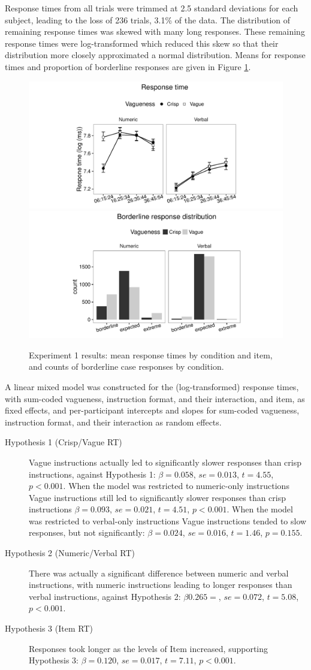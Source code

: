 Response times from all trials were trimmed at 2.5 standard deviations for each subject, leading to the loss of 236 trials, 3.1\% of the data. The distribution of remaining response times was skewed with many long responses. These remaining response times were log-transformed which reduced this skew so that their distribution more closely approximated a normal distribution. Means for response times and proportion of borderline responses are given in Figure \ref{resultsC-exp-1}. 

\begin{figure}[htbp]
\centering
\includegraphics[trim = 20mm 0mm 30mm 0mm, clip, width=.49\textwidth]{figures/Ce1-rtplot-1.pdf}
\includegraphics[trim = 20mm 0mm 25mm 0mm, clip, width=.49\textwidth]{figures/Ce1-blBarChart-1}
\caption{Experiment 1 results: mean response times by condition and item, and counts of borderline case responses by condition.}
\label{resultsC-exp-1}
\end{figure}

A linear mixed model was constructed for the (log-transformed) response times, with sum-coded vagueness, instruction format, and their interaction, and item, as fixed effects, and per-participant intercepts and slopes for sum-coded vagueness, instruction format, and their interaction as random effects. 

\begin{description}
\item [Hypothesis 1 (Crisp/Vague RT)] Vague instructions actually led to significantly slower responses than crisp instructions, against Hypothesis 1: $\beta=0.058$, $se=0.013$, $t=4.55$, $p<0.001$. When the model was restricted to numeric-only instructions Vague instructions still led to significantly slower responses than crisp instructions $\beta=0.093$, $se=0.021$, $t=4.51$, $p<0.001$. When the model was restricted to verbal-only instructions Vague instructions tended to slow responses, but not significantly: $\beta=0.024$, $se=0.016$, $t=1.46$, $p=0.155$.
\item [Hypothesis 2 (Numeric/Verbal RT)] There was actually a significant difference between numeric and verbal instructions, with numeric instructions leading to longer responses than verbal instructions, against Hypothesis 2: $\beta0.265=$, $se=0.072$, $t=5.08$, $p<0.001$.
\item [Hypothesis 3 (Item RT)] Responses took longer as the levels of Item increased, supporting Hypothesis 3: $\beta=0.120$, $se=0.017$, $t=7.11$, $p<0.001$.
\end{description}

